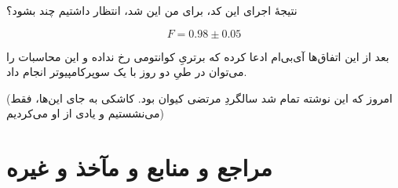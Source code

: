 \documentclass[11pt]{article}
\begin{document}
نتیجهٔ اجرای این کد، برای من این شد، انتظار داشتیم چند بشود؟

\[ F =  0.98 \pm 0.05 \]

بعد از این اتفاق‌ها آی‌بی‌ام ادعا کرده که برتریِ کوانتومی رخ نداده و این محاسبات را می‌توان در طیِ دو روز با یک سوپرکامپیوتر انجام داد. \cite{ibm}

(امروز که این نوشته تمام شد سالگردِ مرتضی کیوان بود. کاشکی به جای این‌ها، فقط می‌نشستیم و یادی از او می‌کردیم)

\section*{مراجع و منابع و مآخذ و غیره}
\begin{latin}
\printbibliography[heading=none]
\end{latin}
\end{document}
